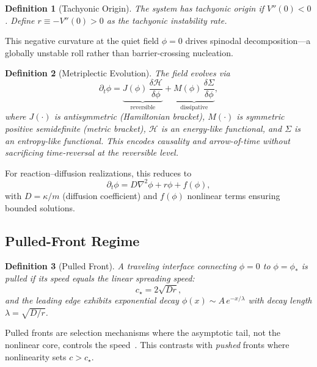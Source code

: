 \documentclass{article}
\newtheorem{definition}{Definition}
\begin{document}
\begin{definition}[Tachyonic Origin]
The system has \emph{tachyonic origin} if $V''(0)<0$. Define $r\equiv -V''(0)>0$ as the tachyonic instability rate.
\end{definition}

This negative curvature at the quiet field $\phi=0$ drives spinodal decomposition—a globally unstable roll rather than barrier-crossing nucleation.

\begin{definition}[Metriplectic Evolution]
The field evolves via
\begin{equation}
\partial_t \phi = \underbrace{J(\phi)\,\frac{\delta \mathcal{H}}{\delta \phi}}_{\text{reversible}} + \underbrace{M(\phi)\,\frac{\delta \Sigma}{\delta \phi}}_{\text{dissipative}},
\end{equation}
where $J(\cdot)$ is antisymmetric (Hamiltonian bracket), $M(\cdot)$ is symmetric positive semidefinite (metric bracket), $\mathcal{H}$ is an energy-like functional, and $\Sigma$ is an entropy-like functional. This encodes causality and arrow-of-time without sacrificing time-reversal at the reversible level.
\end{definition}

For reaction--diffusion realizations, this reduces to
\begin{equation}
\partial_t \phi = D\nabla^2\phi + r\phi + f(\phi),
\label{eq:rd_form}
\end{equation}
with $D=\kappa/m$ (diffusion coefficient) and $f(\phi)$ nonlinear terms ensuring bounded solutions.

\subsection{Pulled-Front Regime}

\begin{definition}[Pulled Front]
A traveling interface connecting $\phi=0$ to $\phi=\phi_\ast$ is \emph{pulled} if its speed equals the linear spreading speed:
\begin{equation}
c_\star = 2\sqrt{Dr},
\label{eq:c_star}
\end{equation}
and the leading edge exhibits exponential decay $\phi(x)\sim A\,e^{-x/\lambda}$ with decay length $\lambda = \sqrt{D/r}$.
\end{definition}

Pulled fronts are selection mechanisms where the asymptotic tail, not the nonlinear core, controls the speed~\cite{vanSaarloos2003}. This contrasts with \emph{pushed} fronts where nonlinearity sets $c>c_\star$.
\end{document}
